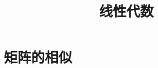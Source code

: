 \documentclass[aspectratio=169,handout]{ctexbeamer}
\title{线性代数}
\begin{document}
\setcounter{part}{3}
\part{矩阵的相似}




\end{document}
